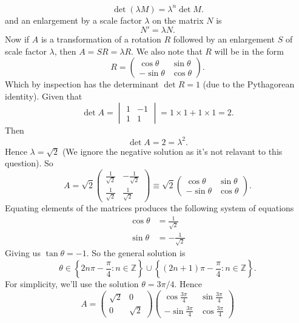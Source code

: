 \documentclass[12pt,oneside]{book}
\begin{document}
\begin{enumerate}
\[            \det(\lambda M) = \lambda^n \det M
        .\] and an enlargement by a scale factor $\lambda$ on the matrix $N$ is \[
            N' = \lambda N
        .\] Now if $A$ is a transformation of a rotation $R$ followed by an enlargement $S$ of scale factor $\lambda$, then $A = SR = \lambda R$. We also note that $R$ will be in the form \[
            R = \begin{pmatrix} \cos \theta & \sin \theta \\ - \sin \theta & \cos \theta \end{pmatrix}
        .\] Which by inspection has the determinant $\det R = 1$ (due to the Pythagorean identity). Given that \[
            \det A = \begin{vmatrix} 1 & -1 \\ 1 & 1 \end{vmatrix} = 1 \times 1 + 1 \times 1 = 2
        .\]  Then \[
            \det A = 2 = \lambda^2
        .\] Hence $\lambda =  \sqrt{2}$ (We ignore the negative solution as it's not relavant to this question). So \[
            A = \sqrt{2} \begin{pmatrix} \frac{1}{\sqrt{2}} & - \frac{1}{\sqrt{2}} \\  \frac{1}{\sqrt{2}} &  \frac{1}{\sqrt{2}} \end{pmatrix} \equiv  \sqrt{2} \begin{pmatrix} \cos \theta & \sin \theta \\ - \sin \theta & \cos \theta \end{pmatrix}
        .\] Equating elements of the matrices produces the following system of equations \begin{align*}
            \cos \theta &=  \frac{1}{\sqrt{2}} \\
            \sin \theta &= - \frac{1}{\sqrt{2}}
        \end{align*}
        Giving us $\tan \theta = -1$. So the general solution is \[
            \theta \in \left\{ 2n \pi - \frac{\pi}{4} : n \in \mathbb{Z} \right \} \cup \left\{ (2n+1) \pi - \frac{\pi}{4} : n \in \mathbb{Z} \right \}
        .\] For simplicity, we'll use the solution $\theta = 3\pi / 4$. Hence \[
            A = \begin{pmatrix} \sqrt{2} & 0 \\ 0 & \sqrt{2} \end{pmatrix} \begin{pmatrix} \cos \frac{3\pi}{4} & \sin \frac{3\pi}{4} \\ -\sin \frac{3\pi}{4} & \cos \frac{3\pi}{4} \end{pmatrix}
\]
\end{enumerate}
\end{document}
